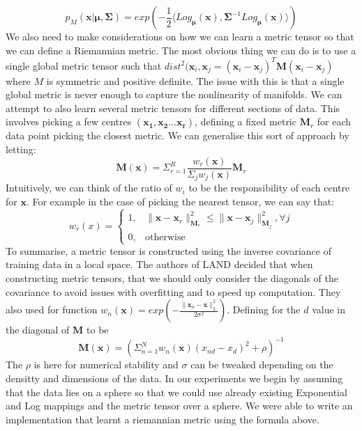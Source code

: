 \documentclass{article}
\begin{document}
$$p_M(\bm{x}|\bm{\mu},\bm{\Sigma}) = exp(-\frac{1}{2}\langle Log_{\bm{\mu}}(\bm{x}),
\bm{\Sigma}^{-1}Log_{\bm{\mu}}(\bm{x})\rangle)$$
We also need to make considerations on how we can learn a metric tensor so that we can define a Riemannian metric.
The most obvious thing we can do is to use a single global metric tensor such that $dist^2(\bm{x}_i, \bm{x}_j = (\bm{x}_i-\bm{x}_j)^T\bm{M}(\bm{x}_i-\bm{x}_j)$ where $M$ is symmetric and positive definite.
The issue with this is that a single global metric is never enough to capture the nonlinearity of manifolds.
We can attempt to also learn several metric tensors for different sections of data.
This involves picking a few centres $(\bm{x_1}, \bm{x_2} ... \bm{x_r})$, defining a fixed metric $\bm{M}_r$ for each data point picking the closest metric.
We can generalise this sort of approach by letting:
$$\bm{M}(\bm{x}) = \Sigma_{r=1}^R\frac{w_r(\bm{x})}{\Sigma_jw_j(\bm{x})}\bm{M}_r$$
Intuitively, we can think of the ratio of $w_i$ to be the responsibility of each centre for $\bm{x}$.
For example in the case of picking the nearest tensor, we can say that:
$$w_r(x) = \begin{cases} 1,&\|\bm{x}-\bm{x}_r\|_{\bm{M}_r}^2 \leq \|\bm{x}-\bm{x}_j\|_{\bm{M}_j}^2, \forall j \\
0,& \text{otherwise}\end{cases}$$
To summarise, a metric tensor is constructed using the inverse covariance of training data in a local space.
The authors of LAND decided that when constructing metric tensors, that we should only consider the diagonals of the covariance to avoid issues with overfitting and to speed up computation.
They also used for function $w_n(\bm{x}) = exp(-\frac{\|\bm{x}_n-\bm{x}\|_2^2}{2\sigma^2})$.
Defining for the $d$ value in the diagonal of $\bm{M}$ to be $$\bm{M}(\bm{x}) = (\Sigma_{n=1}^Nw_n(\bm{x})(x_{nd}-x_d)^2+\rho)^{-1}$$
The $\rho$ is here for numerical stability and $\sigma$ can be tweaked depending on the densitty and dimensions of the data.
In our experiments we begin by assuming that the data lies on a sphere so that we could use already existing Exponential and Log mappings and the metric tensor over a sphere.
We were able to write an implementation that learnt a riemannian metric using the formula above.
\end{document}
